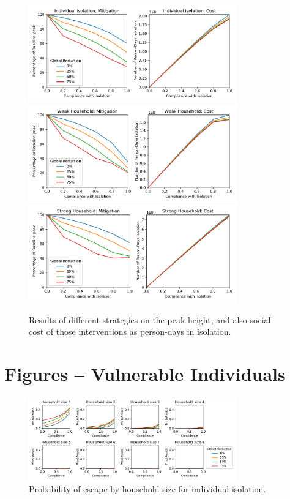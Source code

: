 \documentclass[10pt,a4paper]{article}
\begin{document}
\begin{figure}[H]
\begin{center}
  \includegraphics[width=0.8\textwidth]{figures/mit_costs.pdf}\\
  \includegraphics[width=0.8\textwidth]{figures/mit_costs_weak.pdf}\\
  \includegraphics[width=0.8\textwidth]{figures/mit_costs_strong.pdf}
\end{center}
\caption{Results of different strategies on the peak height, and also
social cost of those interventions as person-days in isolation.}
\end{figure}

\clearpage

\section{Figures -- Vulnerable Individuals}

\begin{figure}[H]
\begin{center}
  \includegraphics[width=0.8\textwidth]{figures/prob_avoid.pdf}
\end{center}
\caption{Probability of escape by household size for individual isolation.}
\end{figure}
\end{document}
